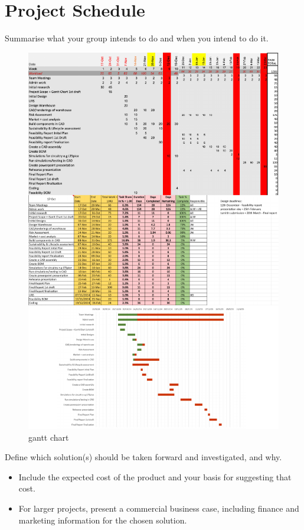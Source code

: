 \documentclass[12pt]{article}
\begin{document}
\section{Project Schedule}
Summarise what your group intends to do and when you intend to do it.
\begin{figure}[h!]
    \centering
     \includegraphics[width=1\textwidth]{gantt chart.pdf}
        \caption{gantt chart}
         \label{fig:timeline}
\end{figure}

Define which solution(s) should be taken forward and investigated, and why.

    \begin{itemize}
        \item Include the expected cost of the product and your basis for suggesting that cost.
        \item For larger projects, present a commercial business case, including finance and marketing information for the chosen solution.
    \end{itemize}
\end{document}
